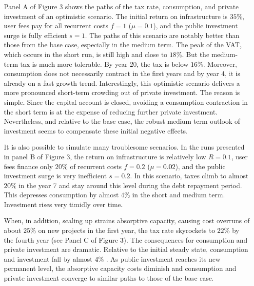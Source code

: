 \documentclass[11pt]{article}
\begin{document}

Panel A of Figure 3 shows the paths of the tax rate, consumption, and
private investment of an optimistic scenario. The initial return on
infrastructure is $35\%$, user fees pay for all recurrent costs $f=1$ ($\mu
=0.1$), and the public investment surge is fully efficient $s=1$. The paths
of this scenario are notably better than those from the base case,
especially in the medium term. The peak of the VAT, which occurs in the
short run, is still high and close to $18\%$. But the medium-term tax is
much more tolerable. By year 20, the tax is below $16\%$. Moreover,
consumption does not necessarily contract in the first years and by year 4,
it is already on a fast growth trend. Interestingly, this optimistic
scenario delivers a more pronounced short-term crowding out of private
investment. The reason is simple. Since the capital account is closed,
avoiding a consumption contraction in the short term is at the expense of
reducing further private investment. Nevertheless, and relative to the base
case, the robust medium term outlook of investment seems to compensate these
initial negative effects.

It is also possible to simulate many troublesome scenarios. In the runs
presented in panel B of Figure 3, the return on infrastructure is relatively
low $R=0.1$, user fees finance only $20\%$ of recurrent costs $f=0.2$ ($\mu
=0.02$), and the public investment surge is very inefficient $s=0.2$. In
this scenario, taxes climb to almost $20\%$ in the year 7 and stay around
this level during the debt repayment period. This depresses consumption by
almost $4\%$ in the short and medium term. Investment rises very timidly
over time.

When, in addition, scaling up strains absorptive capacity, causing cost
overruns of about $25\%$ on new projects in the first year, the tax rate
skyrockets to $22\%$ by the fourth year (see Panel C of Figure 3). The
consequences for consumption and private investment are dramatic. Relative
to the initial steady state, consumption and investment fall by almost $4\%$%
. As public investment reaches its new permanent level, the absorptive
capacity costs diminish and consumption and private investment converge to
similar paths to those of the base case.
\end{document}
